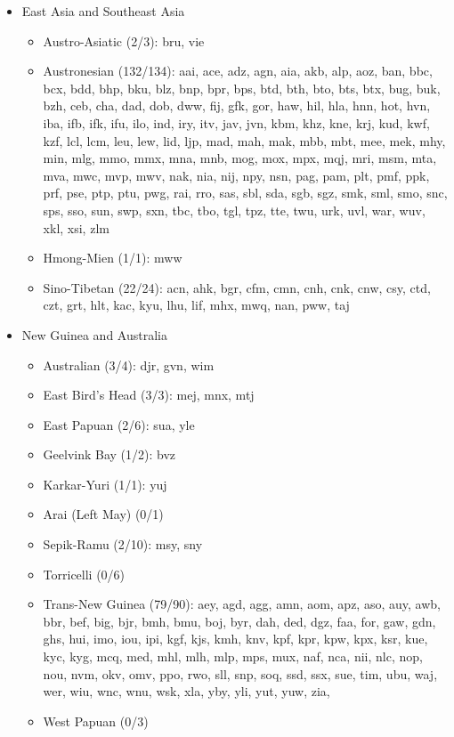 \begin{itemize}[label={},leftmargin=0cm,labelindent=5pt,itemindent=0pt]
  \item East Asia and Southeast Asia
    \begin{itemize}[label={},leftmargin=!,labelindent=5pt,itemindent=-15pt]
  	\item Austro-Asiatic (2/3): bru, vie
  	\item Austronesian (132/134): aai, ace, adz, agn, aia, akb, alp, aoz, ban, bbc, bcx, bdd, bhp, bku, blz, bnp, bpr, bps, btd, bth, bto, bts, btx, bug, buk, bzh, ceb, cha, dad, dob, dww, fij, gfk, gor, haw, hil, hla, hnn, hot, hvn, iba, ifb, ifk, ifu, ilo, ind, iry, itv, jav, jvn, kbm, khz, kne, krj, kud, kwf, kzf, lcl, lcm, leu, lew, lid, ljp, mad, mah, mak, mbb, mbt, mee, mek, mhy, min, mlg, mmo, mmx, mna, mnb, mog, mox, mpx, mqj, mri, msm, mta, mva, mwc, mvp, mwv, nak, nia, nij, npy, nsn, pag, pam, plt, pmf, ppk, prf, pse, ptp, ptu, pwg, rai, rro, sas, sbl, sda, sgb, sgz, smk, sml, smo, snc, sps, sso, sun, swp, sxn, tbc, tbo, tgl, tpz, tte, twu, urk, uvl, war, wuv, xkl, xsi, zlm
  	\item Hmong-Mien (1/1): mww
  	\item Sino-Tibetan (22/24): acn, ahk, bgr, cfm, cmn, cnh, cnk, cnw, csy, ctd, czt, grt, hlt, kac, kyu, lhu, lif, mhx, mwq, nan, pww, taj
    \end{itemize}

  \item New Guinea and Australia
    \begin{itemize}[label={},leftmargin=!,labelindent=5pt,itemindent=-15pt]
  	\item Australian (3/4): djr, gvn, wim
  	\item East Bird's Head (3/3): mej, mnx, mtj
  	\item East Papuan (2/6): sua, yle
  	\item Geelvink Bay (1/2): bvz
  	\item Karkar-Yuri (1/1): yuj
  	\item Arai (Left May) (0/1)
  	\item Sepik-Ramu (2/10): msy, sny
  	\item Torricelli (0/6)
  	\item Trans-New Guinea (79/90): aey, agd, agg, amn, aom, apz, aso, auy, awb, bbr, bef, big, bjr, bmh, bmu, boj, byr, dah, ded, dgz, faa, for, gaw, gdn, ghs, hui, imo, iou, ipi, kgf, kjs, kmh, knv, kpf, kpr, kpw, kpx, ksr, kue, kyc, kyg, mcq, med, mhl, mlh, mlp, mps, mux, naf, nca, nii, nlc, nop, nou, nvm, okv, omv, ppo, rwo, sll, snp, soq, ssd, ssx, sue, tim, ubu, waj, wer, wiu, wnc, wnu, wsk, xla, yby, yli, yut, yuw, zia,
  	\item West Papuan (0/3)
    \end{itemize}


\end{itemize}
